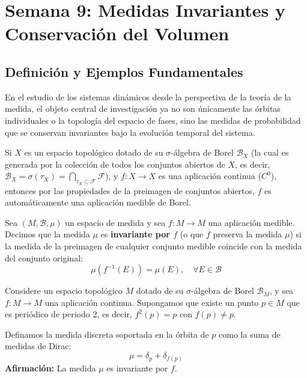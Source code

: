 
\chapter{Semana 9: Medidas Invariantes y Conservación del Volumen}

\section{Definición y Ejemplos Fundamentales}

En el estudio de los sistemas dinámicos desde la perspectiva de la teoría de la medida, el objeto central de investigación ya no son únicamente las órbitas individuales o la topología del espacio de fases, sino las medidas de probabilidad que se conservan invariantes bajo la evolución temporal del sistema.

\begin{observacion}
	Si $X$ es un espacio topológico dotado de su $\sigma$-álgebra de Borel $\mathcal{B}_X$ (la cual es generada por la colección de todos los conjuntos abiertos de $X$, es decir, $\mathcal{B}_X = \sigma(\tau_X) = \bigcap_{\tau_X \subset \mathcal{F}} \mathcal{F}$), y $f: X \to X$ es una aplicación continua ($C^0$), entonces por las propiedades de la preimagen de conjuntos abiertos, $f$ es automáticamente una aplicación medible de Borel.
\end{observacion}

\begin{definicion}
	Sea $(M, \mathcal{B}, \mu)$ un espacio de medida y sea $f: M \to M$ una aplicación medible. Decimos que la medida $\mu$ es \textbf{invariante por $f$} (o que $f$ preserva la medida $\mu$) si la medida de la preimagen de cualquier conjunto medible coincide con la medida del conjunto original:
	$$ \mu(f^{-1}(E)) = \mu(E), \quad \forall E \in \mathcal{B} $$
\end{definicion}

\begin{ejemplo}
	Considere un espacio topológico $M$ dotado de su $\sigma$-álgebra de Borel $\mathcal{B}_M$, y sea $f: M \to M$ una aplicación continua. Supongamos que existe un punto $p \in M$ que es periódico de periodo 2, es decir, $f^2(p) = p$ con $f(p) \neq p$.
	
	Definamos la medida discreta soportada en la órbita de $p$ como la suma de medidas de Dirac:
	$$ \mu = \delta_p + \delta_{f(p)} $$
	\textbf{Afirmación:} La medida $\mu$ es invariante por $f$.
\end{ejemplo}

